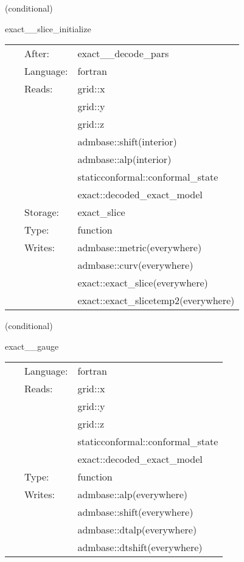    (conditional) 

\hspace{5mm} exact\_\_slice\_initialize 

\hspace{5mm}{\it set initial data from exact solution on an arbitrary slice } 


\hspace{5mm}

 \begin{tabular*}{160mm}{cll} 
~ & After:  & exact\_\_decode\_pars \\ 
~ & Language:  & fortran \\ 
~ & Reads:  & grid::x \\ 
~& ~ &grid::y\\ 
~& ~ &grid::z\\ 
~& ~ &admbase::shift(interior)\\ 
~& ~ &admbase::alp(interior)\\ 
~& ~ &staticconformal::conformal\_state\\ 
~& ~ &exact::decoded\_exact\_model\\ 
~ & Storage:  & exact\_slice \\ 
~ & Type:  & function \\ 
~ & Writes:  & admbase::metric(everywhere) \\ 
~& ~ &admbase::curv(everywhere)\\ 
~& ~ &exact::exact\_slice(everywhere)\\ 
~& ~ &exact::exact\_slicetemp2(everywhere)\\ 
\end{tabular*} 


\vspace{5mm}

   (conditional) 

\hspace{5mm} exact\_\_gauge 

\hspace{5mm}{\it set initial lapse and/or shift from exact solution on a trivial slice } 


\hspace{5mm}

 \begin{tabular*}{160mm}{cll} 
~ & Language:  & fortran \\ 
~ & Reads:  & grid::x \\ 
~& ~ &grid::y\\ 
~& ~ &grid::z\\ 
~& ~ &staticconformal::conformal\_state\\ 
~& ~ &exact::decoded\_exact\_model\\ 
~ & Type:  & function \\ 
~ & Writes:  & admbase::alp(everywhere) \\ 
~& ~ &admbase::shift(everywhere)\\ 
~& ~ &admbase::dtalp(everywhere)\\ 
~& ~ &admbase::dtshift(everywhere)\\ 
\end{tabular*} 


